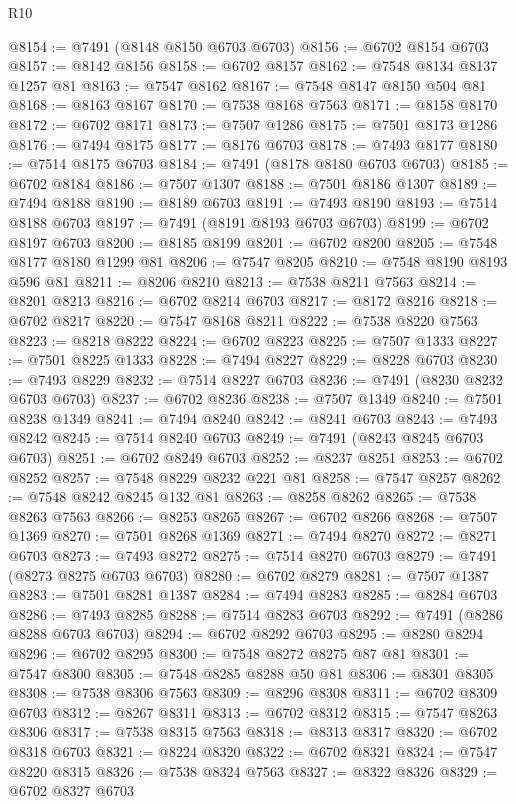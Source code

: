 \begin{lexlean}{R10}
\begin{coremodule}
{{{{{{{{{{{{{{{{{{{{{{{{{{{{{{{{{{{{{{{{{{{{{{{{{{{{{{{{{{{{{{{{{{{{{{{{{{{{{{{{{{{{@8154 := @7491 (@8148 @8150 @6703 @6703)
@8156 := @6702 @8154 @6703
@8157 := @8142 @8156
@8158 := @6702 @8157
@8162 := @7548 @8134 @8137 @1257 @81
@8163 := @7547 @8162
@8167 := @7548 @8147 @8150 @504 @81
@8168 := @8163 @8167
@8170 := @7538 @8168 @7563
@8171 := @8158 @8170
@8172 := @6702 @8171
@8173 := @7507 @1286
@8175 := @7501 @8173 @1286
@8176 := @7494 @8175
@8177 := @8176 @6703
@8178 := @7493 @8177
@8180 := @7514 @8175 @6703
@8184 := @7491 (@8178 @8180 @6703 @6703)
@8185 := @6702 @8184
@8186 := @7507 @1307
@8188 := @7501 @8186 @1307
@8189 := @7494 @8188
@8190 := @8189 @6703
@8191 := @7493 @8190
@8193 := @7514 @8188 @6703
@8197 := @7491 (@8191 @8193 @6703 @6703)
@8199 := @6702 @8197 @6703
@8200 := @8185 @8199
@8201 := @6702 @8200
@8205 := @7548 @8177 @8180 @1299 @81
@8206 := @7547 @8205
@8210 := @7548 @8190 @8193 @596 @81
@8211 := @8206 @8210
@8213 := @7538 @8211 @7563
@8214 := @8201 @8213
@8216 := @6702 @8214 @6703
@8217 := @8172 @8216
@8218 := @6702 @8217
@8220 := @7547 @8168 @8211
@8222 := @7538 @8220 @7563
@8223 := @8218 @8222
@8224 := @6702 @8223
@8225 := @7507 @1333
@8227 := @7501 @8225 @1333
@8228 := @7494 @8227
@8229 := @8228 @6703
@8230 := @7493 @8229
@8232 := @7514 @8227 @6703
@8236 := @7491 (@8230 @8232 @6703 @6703)
@8237 := @6702 @8236
@8238 := @7507 @1349
@8240 := @7501 @8238 @1349
@8241 := @7494 @8240
@8242 := @8241 @6703
@8243 := @7493 @8242
@8245 := @7514 @8240 @6703
@8249 := @7491 (@8243 @8245 @6703 @6703)
@8251 := @6702 @8249 @6703
@8252 := @8237 @8251
@8253 := @6702 @8252
@8257 := @7548 @8229 @8232 @221 @81
@8258 := @7547 @8257
@8262 := @7548 @8242 @8245 @132 @81
@8263 := @8258 @8262
@8265 := @7538 @8263 @7563
@8266 := @8253 @8265
@8267 := @6702 @8266
@8268 := @7507 @1369
@8270 := @7501 @8268 @1369
@8271 := @7494 @8270
@8272 := @8271 @6703
@8273 := @7493 @8272
@8275 := @7514 @8270 @6703
@8279 := @7491 (@8273 @8275 @6703 @6703)
@8280 := @6702 @8279
@8281 := @7507 @1387
@8283 := @7501 @8281 @1387
@8284 := @7494 @8283
@8285 := @8284 @6703
@8286 := @7493 @8285
@8288 := @7514 @8283 @6703
@8292 := @7491 (@8286 @8288 @6703 @6703)
@8294 := @6702 @8292 @6703
@8295 := @8280 @8294
@8296 := @6702 @8295
@8300 := @7548 @8272 @8275 @87 @81
@8301 := @7547 @8300
@8305 := @7548 @8285 @8288 @50 @81
@8306 := @8301 @8305
@8308 := @7538 @8306 @7563
@8309 := @8296 @8308
@8311 := @6702 @8309 @6703
@8312 := @8267 @8311
@8313 := @6702 @8312
@8315 := @7547 @8263 @8306
@8317 := @7538 @8315 @7563
@8318 := @8313 @8317
@8320 := @6702 @8318 @6703
@8321 := @8224 @8320
@8322 := @6702 @8321
@8324 := @7547 @8220 @8315
@8326 := @7538 @8324 @7563
@8327 := @8322 @8326
@8329 := @6702 @8327 @6703
}}}}}}}}}}}}}}}}}}}}}}}}}}}}}}}}}}}}}}}}}}}}}}}}}}}}}}}}}}}}}}}}}}}}}}}}}}}}}}}}}}}}
\end{coremodule}
\end{lexlean}
